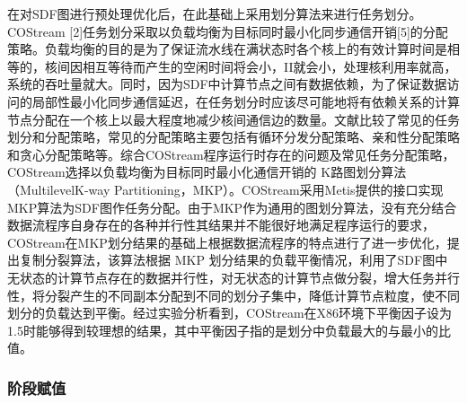 在对SDF图进行预处理优化后，在此基础上采用划分算法来进行任务划分。COStream [2]任务划分采取以负载均衡为目标同时最小化同步通信开销[5]的分配策略。负载均衡的目的是为了保证流水线在满状态时各个核上的有效计算时间是相等的，核间因相互等待而产生的空闲时间将会小，II就会小，处理核利用率就高，系统的吞吐量就大。同时，因为SDF中计算节点之间有数据依赖，为了保证数据访问的局部性最小化同步通信延迟，在任务划分时应该尽可能地将有依赖关系的计算节点分配在一个核上以最大程度地减少核间通信边的数量。文献比较了常见的任务划分和分配策略，常见的分配策略主要包括有循环分发分配策略、亲和性分配策略和贪心分配策略等。综合COStream程序运行时存在的问题及常见任务分配策略，COStream选择以负载均衡为目标同时最小化通信开销的 K路图划分算法（MultilevelK-way Partitioning，MKP）。COStream采用Metis提供的接口实现MKP算法为SDF图作任务分配。由于MKP作为通用的图划分算法，没有充分结合数据流程序自身存在的各种并行性其结果并不能很好地满足程序运行的要求，COStream在MKP划分结果的基础上根据数据流程序的特点进行了进一步优化，提出复制分裂算法，该算法根据 MKP 划分结果的负载平衡情况，利用了SDF图中无状态的计算节点存在的数据并行性，对无状态的计算节点做分裂，增大任务并行性，将分裂产生的不同副本分配到不同的划分子集中，降低计算节点粒度，使不同划分的负载达到平衡。经过实验分析看到，COStream在X86环境下平衡因子设为1.5时能够得到较理想的结果，其中平衡因子指的是划分中负载最大的与最小的比值。

\subsubsection{阶段赋值}

